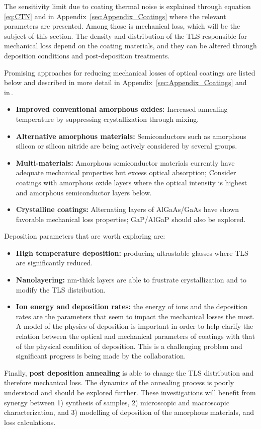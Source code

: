 The sensitivity limit due to coating thermal noise is explained through equation\,\ref{eq:CTN} and in Appendix~\ref{sec:Appendix_Coatings} where the relevant parameters are presented. Among those is mechanical loss, which will be the subject of this section. The density and distribution of the \ac{TLS} responsible for mechanical loss depend on the coating materials, and they can be altered through deposition conditions and post-deposition treatments.

\noindent Promising approaches for reducing mechanical losses of optical coatings are listed below and described in more detail in Appendix~\ref{sec:Appendix_Coatings} and in\,\cite{DawnIV2018}.
\begin{itemize}
    \item\textbf{Improved conventional amorphous oxides:} Increased annealing temperature by suppressing crystallization through mixing.
    \item\textbf{Alternative amorphous materials:} Semiconductors such as amorphous silicon or silicon nitride are being actively considered by several groups.
    \item\textbf{Multi-materials:} Amorphous semiconductor materials currently have adequate mechanical properties but excess optical absorption; Consider coatings with amorphous oxide layers where the optical intensity is highest and amorphous semiconductor layers below.
    \item\textbf{Crystalline coatings:} Alternating layers of \ac{AlGaAs/GaAs} have shown favorable mechanical loss properties; \ac{GaP/AlGaP} should also be explored.
\end{itemize}
Deposition parameters that are worth exploring are: 
\begin{itemize}
    \item\textbf{High temperature deposition:} producing ultrastable glasses where \ac{TLS} are significantly reduced.
    \item\textbf{Nanolayering:} nm-thick layers are able to frustrate crystallization and to modify the \ac{TLS} distribution.
    \item\textbf{Ion energy and deposition rates:} the energy of ions and the deposition rates are the parameters that seem to impact the mechanical losses the most. A model of the physics of deposition is important in order to help clarify the relation between the optical and mechanical parameters of coatings with that of the physical condition of deposition. This is a challenging problem and significant progress is being made by the collaboration.
\end{itemize}
Finally, \textbf{post deposition annealing} is able to change the \ac{TLS} distribution and therefore mechanical loss. The dynamics of the annealing process is poorly understood and should be explored further.
These investigations will benefit from synergy between 1) synthesis of samples, 2) microscopic and macroscopic characterization, and 3) modelling of deposition of the amorphous materials, and loss calculations.

